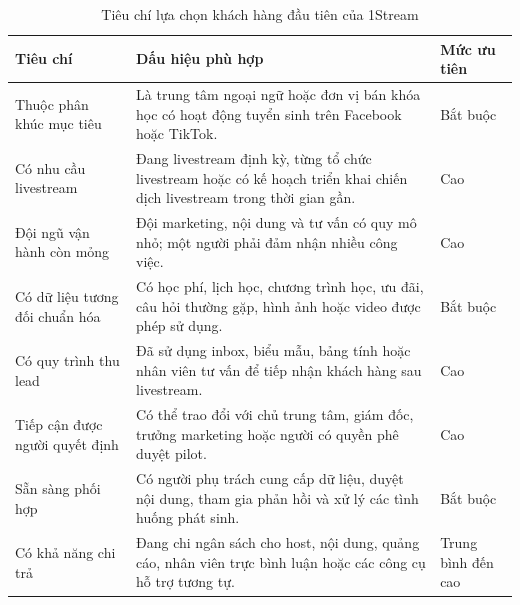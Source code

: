 \begin{table}[htbp]
    \centering
    \caption{Tiêu chí lựa chọn khách hàng đầu tiên của 1Stream}
    \label{tab:first-customer-selection-criteria}
    \begin{tabular}{
        p{}
        p{}
        p{}
    }
        \hline
        \textbf{Tiêu chí}
        & \textbf{Dấu hiệu phù hợp}
        & \textbf{Mức ưu tiên} \\
        \hline

        Thuộc phân khúc mục tiêu
        &
        Là trung tâm ngoại ngữ hoặc đơn vị bán khóa học có hoạt động tuyển sinh trên Facebook hoặc TikTok.
        &
        Bắt buộc \\

        \hline

        Có nhu cầu livestream
        &
        Đang livestream định kỳ, từng tổ chức livestream hoặc có kế hoạch triển khai chiến dịch livestream trong thời gian gần.
        &
        Cao \\

        \hline

        Đội ngũ vận hành còn mỏng
        &
        Đội marketing, nội dung và tư vấn có quy mô nhỏ; một người phải đảm nhận nhiều công việc.
        &
        Cao \\

        \hline

        Có dữ liệu tương đối chuẩn hóa
        &
        Có học phí, lịch học, chương trình học, ưu đãi, câu hỏi thường gặp, hình ảnh hoặc video được phép sử dụng.
        &
        Bắt buộc \\

        \hline

        Có quy trình thu lead
        &
        Đã sử dụng inbox, biểu mẫu, bảng tính hoặc nhân viên tư vấn để tiếp nhận khách hàng sau livestream.
        &
        Cao \\

        \hline

        Tiếp cận được người quyết định
        &
        Có thể trao đổi với chủ trung tâm, giám đốc, trưởng marketing hoặc người có quyền phê duyệt pilot.
        &
        Cao \\

        \hline

        Sẵn sàng phối hợp
        &
        Có người phụ trách cung cấp dữ liệu, duyệt nội dung, tham gia phản hồi và xử lý các tình huống phát sinh.
        &
        Bắt buộc \\

        \hline

        Có khả năng chi trả
        &
        Đang chi ngân sách cho host, nội dung, quảng cáo, nhân viên trực bình luận hoặc các công cụ hỗ trợ tương tự.
        &
        Trung bình đến cao \\

        \hline
    \end{tabular}
\end{table}

